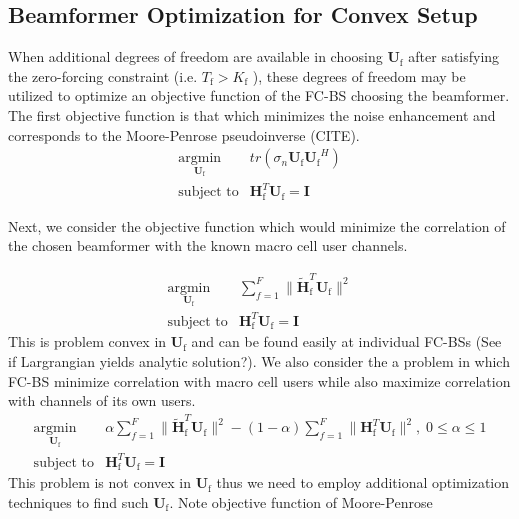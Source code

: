 \documentclass[12pt,a4paper]{report}
\begin{document}
\subsection{Beamformer Optimization for Convex Setup}
When additional degrees of freedom are available in choosing $\mathbf{U}_{\mathrm{f}}$ after satisfying the zero-forcing constraint (i.e. $T_{\text{f}}> K_{\text{f}}$ ), these degrees of freedom may be utilized to optimize an objective function of the FC-BS choosing the beamformer. 
The first objective function is that which minimizes the noise enhancement and corresponds to the Moore-Penrose pseudoinverse (CITE). 
    \begin{equation}
    \begin{array}{ll}
    \underset{\mathbf{U}_{\mathrm{f}} }{\text{argmin}}   & tr(\sigma_n\mathbf{U_{\mathrm{f}}}  \mathbf{U_{\mathrm{f}}}^H)
    \\
    \mbox{subject to} & \mathbf{H}_{\mathrm{f}}^T  \mathbf{U_{\mathrm{f}}} = \mathbf{I}
    \end{array}
    \label{e-opt-prob}
    \end{equation}

Next, we consider the objective function which would minimize the correlation of the chosen beamformer with the known macro cell user channels.

    \begin{equation}
    \begin{array}{ll}
    \underset{\mathbf{U}_{\mathrm{f}} }{\text{argmin}}   & \sum^F_{f=1} \|\mathbf{\tilde{H}}_{\mathrm{f}}^T  \mathbf{U_{\mathrm{f}}}\|^2
    \\
    \mbox{subject to} & \mathbf{H}_{\mathrm{f}}^T  \mathbf{U_{\mathrm{f}}} = \mathbf{I}
    \end{array}
    \label{e-opt-prob}
    \end{equation}
This is problem convex in $\mathbf{U}_{\mathrm{f}}$ and can be found easily at individual FC-BSs (See if Largrangian yields analytic solution?).
We also consider the a problem in which FC-BS minimize correlation with macro cell users while also maximize correlation with channels of its own users. 
    \begin{equation}
    \begin{array}{ll}
    \underset{\mathbf{U}_{\mathrm{f}} }{\text{argmin}}   & \alpha\sum^F_{f=1} \|\mathbf{\tilde{H}}_{\mathrm{f}}^T  \mathbf{U_{\mathrm{f}}}\|^2
    -
    (1-\alpha)\sum^F_{f=1} \|\mathbf{H}_{\mathrm{f}}^T  \mathbf{U_{\mathrm{f}}}\|^2, \; 0\leq \alpha \leq 1
    \\
    \mbox{subject to} & \mathbf{H}_{\mathrm{f}}^T  \mathbf{U_{\mathrm{f}}} = \mathbf{I}
    \end{array}
    \label{e-opt-prob}
    \end{equation}
    This problem is not convex in $\mathbf{U}_{\mathrm{f}}$ thus we need to employ additional optimization techniques to find such $\mathbf{U}_{\mathrm{f}}$.
Note objective function of Moore-Penrose
\end{document}
